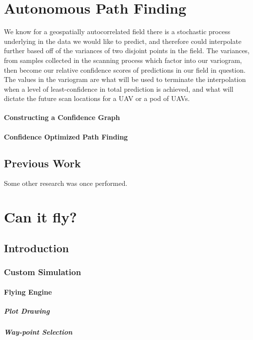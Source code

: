 \documentclass[11pt]{ucthesis}
\begin{document}
\part{Autonomous Path Finding}
We know for a geospatially autocorrelated field there is a stochastic process underlying in the data we would like to predict, and therefore could interpolate further based off of the variances of two disjoint points in the field. The variances, from samples collected in the scanning process which factor into our variogram, then become our relative confidence scores of predictions in our field in question. The values in the variogram are what will be used to terminate the interpolation when a level of least-confidence in total prediction is achieved, and what will dictate the future scan locations for a UAV or a pod of UAVs.
\subsection{Constructing a Confidence Graph}
\subsection{Confidence Optimized Path Finding}

\chapter{Previous Work}
Some other research was once performed.

\part{Can it fly?}
\chapter{Introduction}

\section{Custom Simulation}
\subsection{Flying Engine}
\subsubsection{Plot Drawing}
\subsubsection{Way-point Selection}
\end{document}
